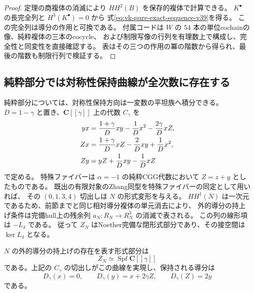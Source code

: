 \begin{proof}
定理の商複体の消滅により $HH^2(B)$ を保存的複体で計算できる。
$K^\bullet$ の長完全列と $H^3(K^\bullet)=0$ から
式\eqref{eq:vk-pure-exact-sequence-v39}を得る。
この完全列は導分の作用と可換である。
付属コードは $W$ の $54$ 本の単位cochainの像、純粋複体の三本のcocycle、
および制限写像の行列を有理数上で構成し、完全性と同変性を直接確認する。
表はその三つの作用の冪の階数から得られ、最後の階数も制限行列で検証する。
\end{proof}

\subsection{純粋部分では対称性保持曲線が全次数に存在する}

純粋部分については、対称性保持方向は一変数の平坦族へ積分できる。
$D=1-\gamma$ と置き、$\mathbf C[[\gamma]]$ 上の代数 $C_\gamma$ を
\begin{align}
 yx&=\frac{1+\gamma}{D}xy-\frac1D x^2-\frac{2\gamma}{D}xZ,
 \notag\\
 Zx&=\frac{1+\gamma}{D}xZ-\frac2Dxy+\frac1D x^2,
 \label{eq:vk-pure-gamma-relations-v39}\\
 Zy&=yZ+\frac1Dxy-\frac1D xZ
 \notag
\end{align}
で定める。
特殊ファイバーは $\alpha=-1$ の純粋CGG代数において $Z=z+y$ としたものである。
既出の有限対象のZhang同型を特殊ファイバーの同定として用いれば、
その $(0,1,3,4)$ 切出しは $N$ の形式変形を与える。
$HH^1(N)$ は一次元であるため、前節までと同じ相対導分複体の単元消去により、
外的導分の持上げ条件は完備hull上の残余列 $a_N:R_N\to R_N^3$ の消滅で表される。
この列の線形項は $-L_\delta$ である。
従って $Z_N$ はNoether完備な閉形式部分であり、その接空間は $\ker L_\delta$ となる。

\begin{proposition}[純粋対称性保持部分の滑らかさ]
\label{prop:vk-pure-symmetry-curve-v39}
$N$ の外的導分の持上げの存在を表す形式部分は
\[
 Z_N\simeq\operatorname{Spf}\mathbf C[[\gamma]]
\]
である。上記の $C_\gamma$ の切出しがこの曲線を実現し、保持される導分は
\begin{equation}
 D_\gamma(x)=0,\qquad D_\gamma(y)=x+2\gamma Z,\qquad
 D_\gamma(Z)=2y
 \label{eq:vk-pure-gamma-derivation-v39}
\end{equation}
である。
\end{proposition}


